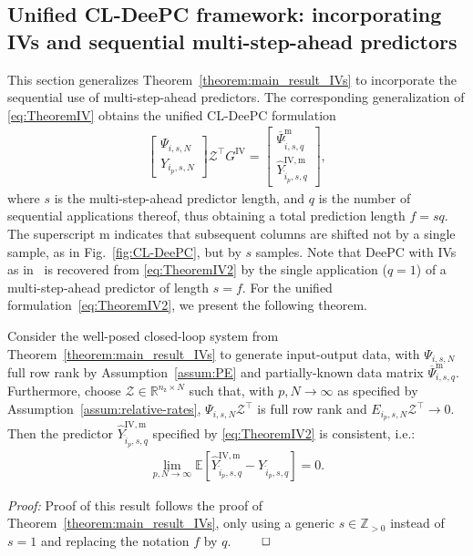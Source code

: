 \subsection{Unified \ac{CL-DeePC} framework: incorporating \ac{IVs} and sequential multi-step-ahead predictors}
\noindent This section generalizes Theorem~\ref{theorem:main_result_IVs} to incorporate the sequential use of multi-step-ahead predictors. The corresponding generalization of \eqref{eq:TheoremIV} obtains the unified \ac{CL-DeePC} formulation
\begin{align}\label{eq:TheoremIV2}
    \begin{bmatrix}
        \Psi_{i,s,N}\\Y_{i_p,s,N}
    \end{bmatrix}\mathcal{Z}^\top G^\mathrm{IV} =
    \begin{bmatrix}
        \overline{\Psi}_{\hat{i},s,q}^\mathrm{m}\\\widehat{Y}_{\hat{i}_p,s,q}^\mathrm{IV,m}
    \end{bmatrix},
\end{align}
where $s$ is the multi-step-ahead predictor length, and $q$ is the number of sequential applications thereof, thus obtaining a total prediction length $f=sq$. The superscript $\mathrm{m}$ indicates that subsequent columns are shifted not by a single sample, as in Fig.~\ref{fig:CL-DeePC}, but by $s$ samples. Note that \ac{DeePC} with \ac{IVs} as in~\cite{vanWingerden2022} is recovered from \eqref{eq:TheoremIV2} by the single application ($q=1$) of a multi-step-ahead predictor of length $s=f$. For the unified formulation~\eqref{eq:TheoremIV2}, we present the following theorem.
\setcounter{thm}{1}
\begin{thm}\label{theorem:general_IV}
Consider the well-posed closed-loop system from Theorem~\ref{theorem:main_result_IVs} to generate input-output data, with $\Psi_{i,s,N}$ full row rank by Assumption~\ref{assum:PE} and partially-known data matrix $\overline{\Psi}_{i,s,q}^\mathrm{m}$. Furthermore, choose $\mathcal{Z}\in\mathbb{R}^{n_\mathrm{z}\times N}$ such that, with $p,N\rightarrow\infty$ as specified by Assumption~\ref{assum:relative-rates}, $\Psi_{i,s,N}\mathcal{Z}^\top$ is full row rank and $E_{i_p,s,N}\mathcal{Z}^\top\rightarrow0$. Then the predictor $\widehat{Y}_{\hat{i}_p,s,q}^\mathrm{IV,m}$ specified by \eqref{eq:TheoremIV2} is consistent, i.e.:
\begin{align*}%
    \lim_{p,N\rightarrow\infty}\mathbb{E}\left[\widehat{Y}_{\hat{i}_p,s,q}^\mathrm{IV,m}-Y_{\hat{i}_p,s,q}\right]=0.
\end{align*}
\end{thm}
\textit{Proof:} %
Proof of this result follows the proof of Theorem~\ref{theorem:main_result_IVs}, only using a generic $s\in\mathbb{Z}_{>0}$ instead of $s=1$ and replacing the notation $f$ by $q$. $\hfill\qed$

